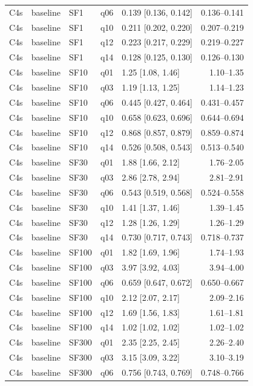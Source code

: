 \begin{longtable}{lllllr}
C4s & baseline & SF1 & q06 & 0.139 [0.136, 0.142] & 0.136--0.141 \\
C4s & baseline & SF1 & q10 & 0.211 [0.202, 0.220] & 0.207--0.219 \\
C4s & baseline & SF1 & q12 & 0.223 [0.217, 0.229] & 0.219--0.227 \\
C4s & baseline & SF1 & q14 & 0.128 [0.125, 0.130] & 0.126--0.130 \\
C4s & baseline & SF10 & q01 & 1.25 [1.08, 1.46] & 1.10--1.35 \\
C4s & baseline & SF10 & q03 & 1.19 [1.13, 1.25] & 1.14--1.23 \\
C4s & baseline & SF10 & q06 & 0.445 [0.427, 0.464] & 0.431--0.457 \\
C4s & baseline & SF10 & q10 & 0.658 [0.623, 0.696] & 0.644--0.694 \\
C4s & baseline & SF10 & q12 & 0.868 [0.857, 0.879] & 0.859--0.874 \\
C4s & baseline & SF10 & q14 & 0.526 [0.508, 0.543] & 0.513--0.540 \\
C4s & baseline & SF30 & q01 & 1.88 [1.66, 2.12] & 1.76--2.05 \\
C4s & baseline & SF30 & q03 & 2.86 [2.78, 2.94] & 2.81--2.91 \\
C4s & baseline & SF30 & q06 & 0.543 [0.519, 0.568] & 0.524--0.558 \\
C4s & baseline & SF30 & q10 & 1.41 [1.37, 1.46] & 1.39--1.45 \\
C4s & baseline & SF30 & q12 & 1.28 [1.26, 1.29] & 1.26--1.29 \\
C4s & baseline & SF30 & q14 & 0.730 [0.717, 0.743] & 0.718--0.737 \\
C4s & baseline & SF100 & q01 & 1.82 [1.69, 1.96] & 1.74--1.93 \\
C4s & baseline & SF100 & q03 & 3.97 [3.92, 4.03] & 3.94--4.00 \\
C4s & baseline & SF100 & q06 & 0.659 [0.647, 0.672] & 0.650--0.667 \\
C4s & baseline & SF100 & q10 & 2.12 [2.07, 2.17] & 2.09--2.16 \\
C4s & baseline & SF100 & q12 & 1.69 [1.56, 1.83] & 1.61--1.81 \\
C4s & baseline & SF100 & q14 & 1.02 [1.02, 1.02] & 1.02--1.02 \\
C4s & baseline & SF300 & q01 & 2.35 [2.25, 2.45] & 2.26--2.40 \\
C4s & baseline & SF300 & q03 & 3.15 [3.09, 3.22] & 3.10--3.19 \\
C4s & baseline & SF300 & q06 & 0.756 [0.743, 0.769] & 0.748--0.766 \\

\end{longtable}
